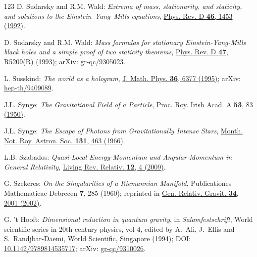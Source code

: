 \begin{thebibliography}{123}
D. Sudarsky and R.M. Wald: {\em Extrema of mass, stationarity, and staticity,
and solutions to the Einstein–Yang–Mills equations},
\href{https://doi.org/10.1103/PhysRevD.46.1453}{Phys. Rev. D {\bf 46}, 1453 (1992)}.

D. Sudarsky and R.M. Wald:
{\em Mass formulas for stationary Einstein-Yang-Mills black holes and a simple proof of two staticity theorems},
\href{https://doi.org/10.1103/PhysRevD.47.R5209}{Phys. Rev. D {\bf 47}, R5209(R) (1993)};
arXiv: \href{https://arxiv.org/abs/gr-qc/9305023}{gr-qc/9305023}.

L. Susskind:
{\em The world as a hologram},
\href{https://doi.org/10.1063/1.531249}{J. Math. Phys. {\bf 36}, 6377 (1995)};
arXiv: \href{https://arxiv.org/abs/hep-th/9409089}{hep-th/9409089}.

J.L. Synge: {\em The Gravitational Field of a Particle},
\href{https://www.jstor.org/stable/20488511}{Proc. Roy. Irish Acad. A {\bf 53}, 83 (1950)}.

J.L. Synge: {\em The Escape of Photons from Gravitationally Intense Stars},
\href{https://doi.org/10.1093/mnras/131.3.463}{Month. Not. Roy. Astron. Soc. {\bf 131}, 463 (1966)}.

L.B. Szabados:
{\em Quasi-Local Energy-Momentum and Angular Momentum in General Relativity},
\href{https://doi.org/10.12942/lrr-2009-4}{Living Rev. Relativ. {\bf 12}, 4 (2009)}.


G. Szekeres:
{\em On the Singularities of a Riemannian Manifold},
Publicationes Mathematicae Debrecen {\bf 7}, 285 (1960); reprinted in
\href{https://doi.org/10.1023/A:1020744914721}{Gen. Relativ. Gravit. {\bf 34}, 2001 (2002)}.


G. 't Hooft:
{\em Dimensional reduction in quantum gravity},
in {\em Salamfestschrift}, World scientific series in 20th century physics, vol 4,
edited by A.~Ali, J.~Ellis and S.~Randjbar-Daemi,
World Scientific, Singapore (1994);
DOI: \href{https://doi.org/10.1142/9789814535717}{10.1142/9789814535717};
arXiv: \href{https://arxiv.org/abs/gr-qc/9310026}{gr-qc/9310026}.


\end{thebibliography}
